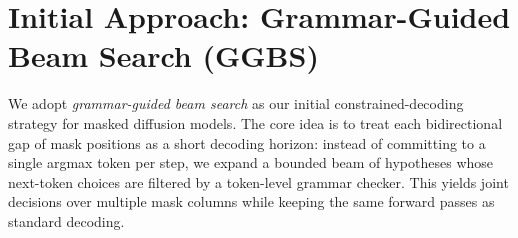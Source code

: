 



\section{Initial Approach: Grammar-Guided Beam Search (GGBS)}

We adopt \emph{grammar-guided beam search} as our initial constrained-decoding strategy for masked diffusion models. The core idea is to treat each bidirectional gap of mask positions as a short decoding horizon: instead of committing to a single argmax token per step, we expand a bounded beam of hypotheses whose next-token choices are filtered by a token-level grammar checker. This yields joint decisions over multiple mask columns while keeping the same forward passes as standard decoding.

